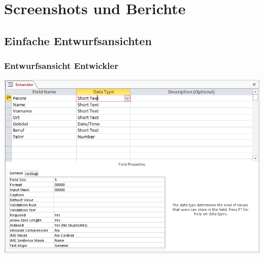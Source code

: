 \newcommand{\customDir}{../../../../}




\setCustomSignature{\footnotesize{\textcolor{darkgray}{Beleg von\\ \customAuthor}}}	%
\setCustomTitleAuthor{\textcolor{darkgray}{\customAuthor}}	%




%

\newcommand{\folie}[2]{\begin{center}
\texttt{[image: Vorlesung/oneperpage/Kap\#1.pdf]}
\end{center}}
\newcommand{\Folie}[2]{\begin{center}
\texttt{[image: Vorlesung/oneperpage/Kap\#1.pdf]}
\end{center}}


\maketitle
\newpage
\tableofcontents
\newpage

\chapter{Screenshots und Berichte}
\section{Einfache Entwurfsansichten}
\subsection{Entwurfsansicht Entwickler}
\includegraphics[width=.98\columnwidth]{1Entwickler.PNG}
